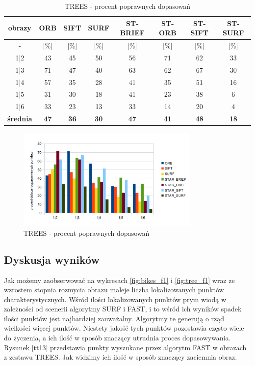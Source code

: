 \begin{table}[htbp]
  \centering
  \caption{TREES - procent poprawnych dopasowań}
    \begin{tabular}{|c|c|c|c|c|c|c|c|}\hline
    obrazy & \textbf{ORB} & \textbf{SIFT} & \textbf{SURF} & \textbf{ST-BRIEF} & \textbf{ST-ORB} & \textbf{ST-SIFT} & \textbf{ST-SURF} \\\hline
     - & [\%] & [\%] & [\%] & [\%] & [\%] & [\%] & [\%] \\\hline
    1|2 & 43 & 45 & 50 & 56 & 71 & 62 & 33 \\
    1|3 & 71 & 47 & 40 & 63 & 62 & 67 & 30 \\
    1|4 & 57 & 35 & 28 & 41 & 35 & 51 & 16 \\
    1|5 & 31 & 30 & 18 & 41 & 23 & 38 & 6 \\
    1|6 & 33 & 23 & 13 & 33 & 14 & 20 & 4 \\\hline
    \textbf{średnia} & \textbf{47} & \textbf{36} & \textbf{30} & \textbf{47} & \textbf{41} & \textbf{48} & \textbf{18} \\\hline
    
    \end{tabular}%
  \label{tab:trees_m2}%
\end{table}%


\begin{figure}
\centering
\includegraphics[width=0.8\textwidth]{pict/mikolajczyk/trees/m2.png}
\caption{TREES - procent poprawnych dopasowań}
\label{fig:trees_m2}
\end{figure}
\FloatBarrier
\subsection{Dyskusja wyników}
Jak możemy zaobserwować na wykresach \ref{fig:bikes_f1} i \ref{fig:tree_f1} wraz ze wzrostem stopnia rozmycia obrazu maleje liczba lokalizowanych punktów charakterystycznych. Wśród ilości lokalizowanych punktów prym wiodą w zależności od scenerii algorytmy SURF i FAST, i to wśród ich wyników spadek ilości punktów jest najbardziej zauważalny. Algorytmy te generują o rząd wielkości więcej punktów. Niestety jakość tych punktów pozostawia często wiele do życzenia, a ich ilość w sposób znaczący utrudnia proces dopasowywania. Rysunek \ref{tt13} przedstawia punkty wyszukane przez algorytm FAST w obrazach z zestawu TREES. Jak widzimy ich ilość w sposób znaczący zaciemnia obraz.

